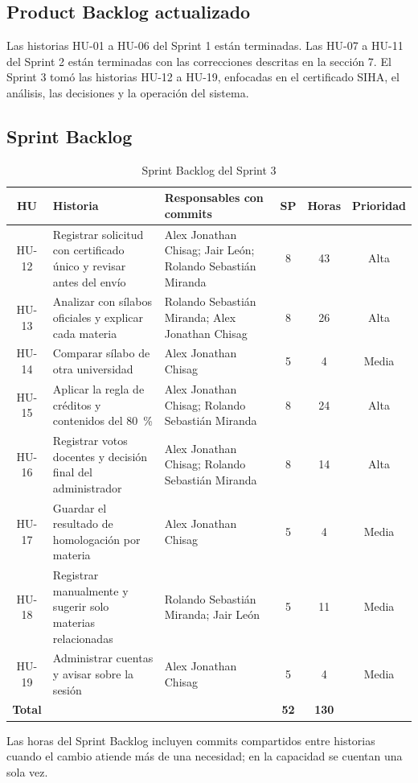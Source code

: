 \subsection{Product Backlog actualizado}
Las historias HU-01 a HU-06 del Sprint 1 están terminadas. Las HU-07 a HU-11 del Sprint 2 están terminadas con las correcciones descritas en la sección 7. El Sprint 3 tomó las historias HU-12 a HU-19, enfocadas en el certificado SIHA, el análisis, las decisiones y la operación del sistema.

\subsection{Sprint Backlog}
\begin{table}[H]\centering\small
\begin{tabularx}{\textwidth}{|c|X|X|c|c|c|}\hline
\rowcolor{grisTarjeta}\textbf{HU} & \textbf{Historia} & \textbf{Responsables con commits} & \textbf{SP} & \textbf{Horas} & \textbf{Prioridad}\\\hline
HU-12 & Registrar solicitud con certificado único y revisar antes del envío & Alex Jonathan Chisag; Jair León; Rolando Sebastián Miranda & 8 & 43 & Alta\\\hline
HU-13 & Analizar con sílabos oficiales y explicar cada materia & Rolando Sebastián Miranda; Alex Jonathan Chisag & 8 & 26 & Alta\\\hline
HU-14 & Comparar sílabo de otra universidad & Alex Jonathan Chisag & 5 & 4 & Media\\\hline
HU-15 & Aplicar la regla de créditos y contenidos del 80~\% & Alex Jonathan Chisag; Rolando Sebastián Miranda & 8 & 24 & Alta\\\hline
HU-16 & Registrar votos docentes y decisión final del administrador & Alex Jonathan Chisag; Rolando Sebastián Miranda & 8 & 14 & Alta\\\hline
HU-17 & Guardar el resultado de homologación por materia & Alex Jonathan Chisag & 5 & 4 & Media\\\hline
HU-18 & Registrar manualmente y sugerir solo materias relacionadas & Rolando Sebastián Miranda; Jair León & 5 & 11 & Media\\\hline
HU-19 & Administrar cuentas y avisar sobre la sesión & Alex Jonathan Chisag & 5 & 4 & Media\\\hline
\textbf{Total} & & & \textbf{52} & \textbf{130} & \\\hline
\end{tabularx}\caption{Sprint Backlog del Sprint 3}
\end{table}
Las horas del Sprint Backlog incluyen commits compartidos entre historias cuando el cambio atiende más de una necesidad; en la capacidad se cuentan una sola vez.

